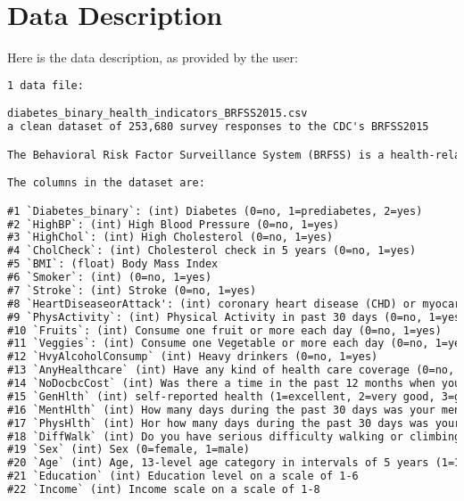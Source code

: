 \documentclass[12pt]{article}
\begin{document}
\clearpage
\appendix
\section{Data Description} \label{sec:data_description} Here is the data description, as provided by the user:

\begin{lstlisting}[language=TeX]
1 data file:

diabetes_binary_health_indicators_BRFSS2015.csv
a clean dataset of 253,680 survey responses to the CDC's BRFSS2015

The Behavioral Risk Factor Surveillance System (BRFSS) is a health-related telephone survey that is collected annually by the CDC. Each year, the survey collects responses from over 400,000 Americans on health-related risk behaviors, chronic health conditions, and the use of preventative services. It has been conducted every year since 1984. For this project, a csv of the dataset available on Kaggle for the year 2015 was used. This original dataset contains responses from 441,455 individuals and has 330 features. These features are either questions directly asked of participants, or calculated variables based on individual participant responses.

The columns in the dataset are:

#1 `Diabetes_binary`: (int) Diabetes (0=no, 1=prediabetes, 2=yes)
#2 `HighBP`: (int) High Blood Pressure (0=no, 1=yes)
#3 `HighChol`: (int) High Cholesterol (0=no, 1=yes)
#4 `CholCheck`: (int) Cholesterol check in 5 years (0=no, 1=yes)
#5 `BMI`: (float) Body Mass Index
#6 `Smoker`: (int) (0=no, 1=yes)
#7 `Stroke`: (int) Stroke (0=no, 1=yes)
#8 `HeartDiseaseorAttack': (int) coronary heart disease (CHD) or myocardial infarction (MI), (0=no, 1=yes)
#9 `PhysActivity`: (int) Physical Activity in past 30 days (0=no, 1=yes)
#10 `Fruits`: (int) Consume one fruit or more each day (0=no, 1=yes)
#11 `Veggies`: (int) Consume one Vegetable or more each day (0=no, 1=yes)
#12 `HvyAlcoholConsump` (int) Heavy drinkers (0=no, 1=yes)
#13 `AnyHealthcare` (int) Have any kind of health care coverage (0=no, 1=yes)
#14 `NoDocbcCost` (int) Was there a time in the past 12 months when you needed to see a doctor but could not because of cost? (0=no, 1=yes)
#15 `GenHlth` (int) self-reported health (1=excellent, 2=very good, 3=good, 4=fair, 5=poor)
#16 `MentHlth` (int) How many days during the past 30 days was your mental health not good? (1-30 days)
#17 `PhysHlth` (int) Hor how many days during the past 30 days was your physical health not good? (1-30 days)
#18 `DiffWalk` (int) Do you have serious difficulty walking or climbing stairs? (0=no, 1=yes)
#19 `Sex` (int) Sex (0=female, 1=male)
#20 `Age` (int) Age, 13-level age category in intervals of 5 years (1=18-24, 2=25-29, ..., 12=75-79, 13=80 or older)
#21 `Education` (int) Education level on a scale of 1-6
#22 `Income` (int) Income scale on a scale of 1-8


\end{lstlisting}
\end{document}
